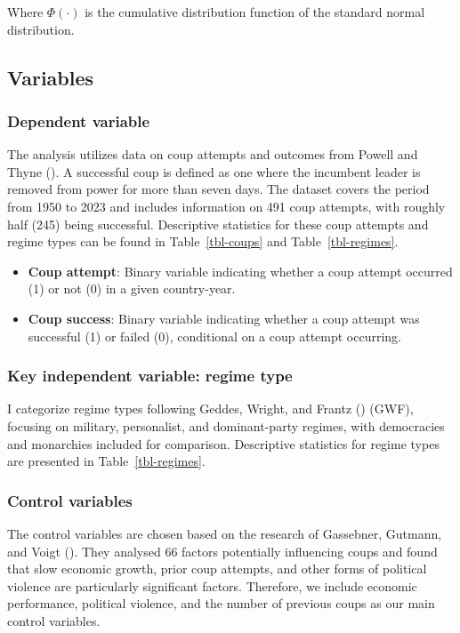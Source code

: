 \documentclass[
  12pt,
]{report}
\begin{document}
Where \(\Phi(\cdot)\) is the cumulative distribution function of the
standard normal distribution.

\subsection{Variables}\label{variables}

\subsubsection{Dependent variable}\label{dependent-variable}

The analysis utilizes data on coup attempts and outcomes from Powell and
Thyne (). A successful coup is defined as
one where the incumbent leader is removed from power for more than seven
days. The dataset covers the period from 1950 to 2023 and includes
information on 491 coup attempts, with roughly half (245) being
successful. Descriptive statistics for these coup attempts and regime
types can be found in Table~\ref{tbl-coups} and Table~\ref{tbl-regimes}.

\begin{itemize}
\item
  \textbf{Coup attempt}: Binary variable indicating whether a coup
  attempt occurred (1) or not (0) in a given country-year.
\item
  \textbf{Coup success}: Binary variable indicating whether a coup
  attempt was successful (1) or failed (0), conditional on a coup
  attempt occurring.
\end{itemize}

\subsubsection{Key independent variable: regime
type}\label{sec-chapter2322}

I categorize regime types following Geddes, Wright, and Frantz
() (GWF), focusing on military,
personalist, and dominant-party regimes, with democracies and monarchies
included for comparison. Descriptive statistics for regime types are
presented in Table~\ref{tbl-regimes}.

\subsubsection{Control variables}\label{control-variables}

The control variables are chosen based on the research of Gassebner,
Gutmann, and Voigt (). They analysed
66 factors potentially influencing coups and found that slow economic
growth, prior coup attempts, and other forms of political violence are
particularly significant factors. Therefore, we include economic
performance, political violence, and the number of previous coups as our
main control variables.
\end{document}
